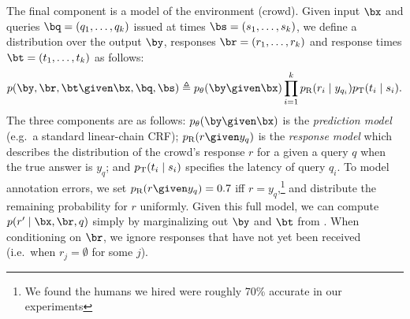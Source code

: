 The final component is a model of the environment (crowd).
Given input $\bx$ and queries $\bq = (q_1, \dots, q_k)$ issued at times $\bs = (s_1, \dots, s_k)$,
we define a distribution over the output $\by$, responses $\br = (r_1, \dots, r_k)$
and response times $\bt = (t_1, \dots, t_k)$ as follows:
\begin{align}
  \label{eqn:dynamics}
p(\by, \br, \bt \given \bx, \bq, \bs) \eqdef \p(\by \given \bx) \prod_{i=1}^k \presp(r_i \mid y_{q_i}) \ptime(t_i \mid s_i).
\end{align}
The three components are as follows:
$\p(\by \given \bx)$ is the \emph{prediction model} (e.g.\ a standard linear-chain CRF);
$\presp(r \given y_q)$ is the \emph{response model} which describes the
distribution of the crowd's response $r$ for a given a query $q$ when the true
answer is $y_q$;
and $p_{\text{T}}(t_i \mid s_i)$ specifies the latency of query $q_i$.
To model annotation errors, we set $\presp(r \given y_q)
= 0.7$ iff $r = y_q$,\footnote{We found the humans we hired were roughly 70\%
accurate in our experiments} and distribute the remaining probability for $r$
uniformly.
%
%
Given this full model, we can compute $p(r' \mid \bx, \br, q)$ simply by marginalizing out $\by$ and $\bt$ from .
When conditioning on $\br$, we ignore responses that have not yet been received (i.e.\ when $r_j = \emptyset$ for some $j$).

